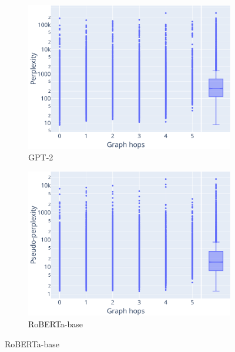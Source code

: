 \documentclass[11pt]{article}
\begin{document}
\begin{figure}
  \centering
    \begin{subfigure}[b]{0.95\textwidth}
      \centering
      \includegraphics[width=0.95\columnwidth, height=0.3\textheight, keepaspectratio, valign=c]{../plots/gpt2_confusion_matrix_values_correlation.pdf}
      \caption{GPT-2}
    \end{subfigure}

    \vspace{1em}

    \begin{subfigure}[b]{0.95\textwidth}
      \centering
      \includegraphics[width=0.95\columnwidth, height=0.3\textheight, keepaspectratio, valign=c]{../plots/roberta-base_confusion_matrix_values_correlation.pdf}
      \caption{RoBERTa-base}
    \end{subfigure}


\end{figure}
\end{document}
